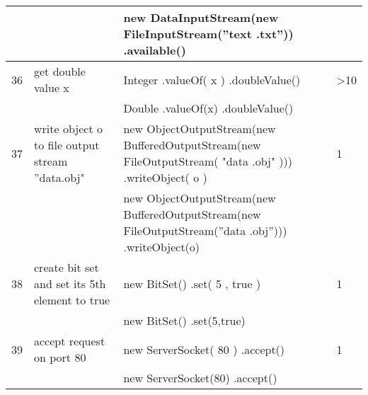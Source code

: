 \begin{longtable}{|p{}|p{}|p{}|p{}|}
		\rowcolor[HTML]{9AFF99} 
		&                                                        & new DataInputStream(new FileInputStream(”text .txt”)) .available()                                               &                                         \\ \hline
		\rowcolor[HTML]{FFCCC9} 
		36                                & get double value x                                     & Integer .valueOf( x ) .doubleValue()                                                                             & \textgreater{}10                        \\ \hline
		\rowcolor[HTML]{9AFF99} 
		&                                                        & Double .valueOf(x) .doubleValue()                                                                                &                                         \\ \hline
		\rowcolor[HTML]{FFCCC9} 
		37                                & write object o to file output stream ”data.obj"        & new ObjectOutputStream(new BufferedOutputStream(new FileOutputStream( "data .obj" ))) .writeObject( o )          & 1                                       \\ \hline
		\rowcolor[HTML]{9AFF99} 
		&                                                        & new ObjectOutputStream(new BufferedOutputStream(new FileOutputStream(”data .obj”))) .writeObject(o)              &                                         \\ \hline
		\rowcolor[HTML]{FFCCC9} 
		38                                & create bit set and set its 5th element to true         & new BitSet()  .set( 5 , true )                                                                                   & 1                                       \\ \hline
		\rowcolor[HTML]{9AFF99} 
		&                                                        & new BitSet() .set(5,true)                                                                                        &                                         \\ \hline
		\rowcolor[HTML]{FFCCC9} 
		39                                & accept request on port 80                              & new ServerSocket( 80 ) .accept()                                                                                 & 1                                       \\ \hline
		\rowcolor[HTML]{9AFF99} 
		&                                                        & new ServerSocket(80) .accept()                                                                                   &                                         \\ \hline

\end{longtable}
